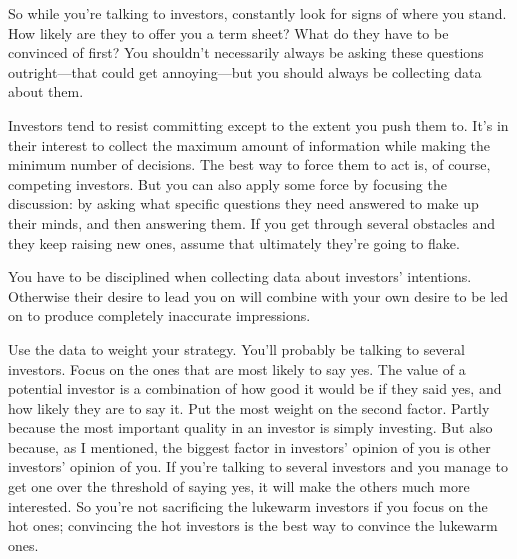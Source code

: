 So while you're talking to investors,
                  constantly look for signs of where you stand. How likely are
                  they to offer you a term sheet? What do they have to be
                  convinced of first? You shouldn't necessarily always be asking
                  these questions outright---that could get
                  annoying---but you should always be collecting data about
                  them.

Investors tend to resist committing except to
                  the extent you push them to. It's in their interest to collect
                  the maximum amount of information while making the minimum
                  number of decisions. The best way to force them to act is, of
                  course, competing investors. But you can also apply some force
                  by focusing the discussion: by asking what specific questions
                  they need answered to make up their minds, and then answering
                  them. If you get through several obstacles and they keep
                  raising new ones, assume that ultimately they're going to
                  flake.

You have to be disciplined when collecting
                  data about investors' intentions. Otherwise their desire to
                  lead you on will combine with your own desire to be led on to
                  produce completely inaccurate impressions.

Use the
                  data to weight your strategy. You'll probably be talking to
                  several investors. Focus on the ones that are most likely to
                  say yes. The value of a potential investor is a combination of
                  how good it would be if they said yes, and how likely they are
                  to say it. Put the most weight on the second factor. Partly
                  because the most important quality in an investor is simply
                  investing. But also because, as I mentioned, the biggest
                  factor in investors' opinion of you is other investors'
                  opinion of you. If you're talking to several investors and you
                  manage to get one over the threshold of saying yes, it will
                  make the others much more interested. So you're not
                  sacrificing the lukewarm investors if you focus on the hot
                  ones; convincing the hot investors is the best way to convince
                  the lukewarm ones.


